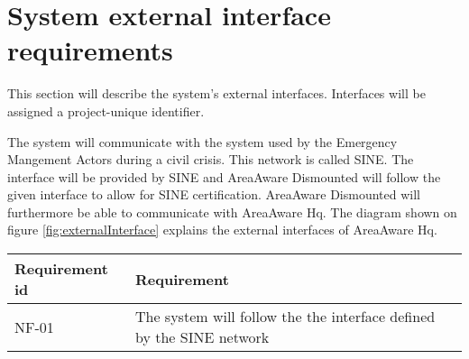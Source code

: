 \FloatBarrier
\newpage

\section{System external interface requirements}
This section will describe the system’s external interfaces. Interfaces will be assigned a project-unique identifier. 

The system will communicate with the system used by the Emergency Mangement Actors during a civil crisis. This network is called SINE. The interface will be provided by SINE and AreaAware Dismounted will follow the given interface to allow for SINE certification. AreaAware Dismounted will furthermore be able to communicate with AreaAware Hq. The diagram shown on figure \ref{fig:externalInterface} explains the external interfaces of AreaAware Hq.


\begin{longtable}{| p{3.2cm} |  p{10cm} | }
	\hline
	\textbf{Requirement id} &  \textbf{Requirement } \\
	\hline
	NF-01 & The system will follow the the interface defined by the SINE network  \\
	\hline
\end{longtable}




